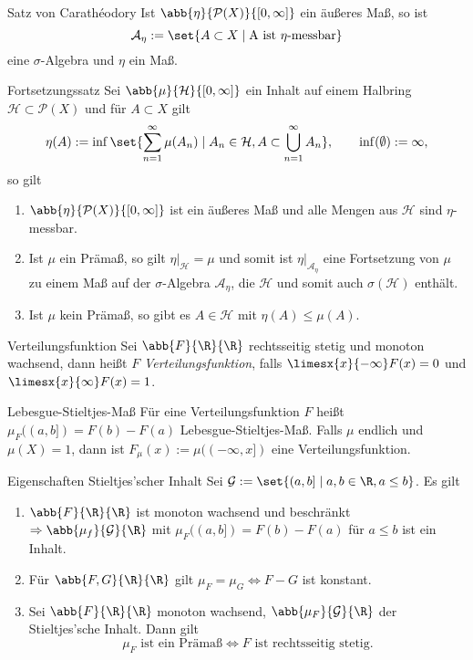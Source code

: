\begin{karte}{Satz von Carathéodory}
	Ist \( \abb{\eta}{\mathcal{P}(X)}{[0,\infty]} \) ein äußeres Maß, so ist 
	\[ \mathcal{A}_\eta := \set{ A\subset X \;|\; \text{A ist \(\eta\)-messbar} } \]
	eine \(\sigma\)-Algebra und \(\eta\) ein Maß.
\end{karte}

\begin{karte}{Fortsetzungssatz}
	Sei \( \abb{\mu}{\mathcal{H}}{[0,\infty]} \) ein Inhalt auf einem 
	Halbring \( \mathcal{H} \subset \mathcal{P}(X) \) und für \( A \subset X \) 
	gilt 
	\[ \eta(A) := \inf \set{ \sum_{n=1}^\infty \mu(A_n) \;|\; A_n \in \mathcal{H}, A \subset \bigcup_{n=1}^\infty A_n }, 
	\qquad \inf(\emptyset) := \infty, \]
	so gilt 
	\begin{enumerate}
		\item \( \abb{\eta}{\mathcal{P}(X)}{[0,\infty]} \) ist ein äußeres Maß 
		und alle Mengen aus \( \mathcal{H} \) sind \(\eta\)-messbar.
		\item Ist \(\mu\) ein Prämaß, so gilt \( \eta|_{\mathcal{H}} = \mu \) 
		und somit ist \( \eta|_{\mathcal{A}_\eta} \) eine Fortsetzung von \(\mu\) 
		zu einem Maß auf der \( \sigma \)-Algebra \( \mathcal{A}_\eta \), die 
		\( \mathcal{H} \) und somit auch \( \sigma(\mathcal{H}) \) enthält.
		\item Ist \(\mu\) kein Prämaß, so gibt es \( A\in \mathcal{H} \) 
		mit \( \eta(A) \leq \mu(A)\).
	\end{enumerate}
\end{karte}


\begin{karte}{Verteilungsfunktion}
	Sei \( \abb{F}{\R}{\R} \) rechtsseitig stetig und monoton wachsend, dann 
	heißt \(F\) \textit{Verteilungsfunktion}, falls \( \limesx{x}{-\infty}F(x) = 0 \) 
	und \( \limesx{x}{\infty}F(x) = 1 \).
\end{karte}

\begin{karte}{Lebesgue-Stieltjes-Maß}
	Für eine Verteilungsfunktion \(F\) heißt \( \mu_F((a,b]) = F(b) - F(a) \) Lebesgue-Stieltjes-Maß. 
	Falls \(\mu\) endlich und \(\mu(X) = 1\), dann ist
	\( F_\mu(x) := \mu((-\infty,x]) \) eine Verteilungsfunktion.
\end{karte}

\begin{karte}{Eigenschaften Stieltjes'scher Inhalt}
	Sei \( \mathcal{G} := \set{ (a,b] \;|\; a,b\in \R, a\leq b } \).
	Es gilt 
	\begin{enumerate}
		\item \( \abb{F}{\R}{\R} \) ist monoton wachsend und beschränkt 
		\( \Rightarrow \abb{\mu_f}{\mathcal{G}}{\R} \) mit 
		\( \mu_F((a,b]) = F(b) - F(a) \) für \(a\leq b\) ist ein Inhalt.
		\item Für \( \abb{F,G}{\R}{\R} \) gilt \( \mu_F = \mu_G \Leftrightarrow F - G\) ist konstant.
		\item Sei \( \abb{F}{\R}{\R} \) monoton wachsend, \( \abb{\mu_F}{\mathcal{G}}{\R} \) der Stieltjes'sche Inhalt. Dann gilt 
		\[ \mu_F \text{ ist ein Prämaß} \Leftrightarrow F \text{ ist rechtsseitig stetig.} \]
	\end{enumerate}
\end{karte}